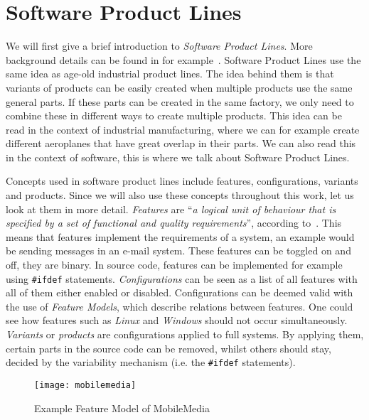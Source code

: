 \section{Software Product Lines}\label{sec:spl}
We will first give a brief introduction to \emph{Software Product Lines}.
More background details can be found in for 
example~\cite{van2001notion, apel2013software, bosch2000design}.
Software Product Lines use the same idea as age-old industrial product lines.
The idea behind them is that variants of products can be easily created when 
multiple products use the same general parts. If these parts can be created
in the same factory, we only need to combine these in different ways to create
multiple products. This idea can be read in the context of industrial
manufacturing, where we can for example create different aeroplanes that have
great overlap in their parts. We can also read this in the context of software,
this is where we talk about Software Product Lines.

Concepts used in software product lines include features, configurations,
variants and products. Since we will also use these concepts throughout this
work, let us look at them in more detail. \emph{Features} are ``\emph{a logical
unit of behaviour that is specified by a set of functional and quality
requirements}'', according to~\cite{bosch2000design}. This means that features
implement the requirements of a system, an example would be sending messages in
an e-mail system. These features can be toggled on and off, they are binary. In
source code, features can be implemented for example using \texttt{\#ifdef}
statements. \emph{Configurations} can be seen as a list of all features with
all of them either enabled or disabled. Configurations can be deemed valid with
the use of \emph{Feature Models}, which describe relations between features.
One could see how features such as \emph{Linux} and \emph{Windows} should not
occur simultaneously. \emph{Variants} or \emph{products} are configurations
applied to full systems. By applying them, certain parts in the source code can
be removed, whilst others should stay, decided by the variability mechanism
(i.e. the \texttt{\#ifdef} statements).

\begin{figure}
    \texttt{[image: mobilemedia]}
    \caption{Example Feature Model of MobileMedia}
    \label{fig:example:mobilemedia}
\end{figure}

